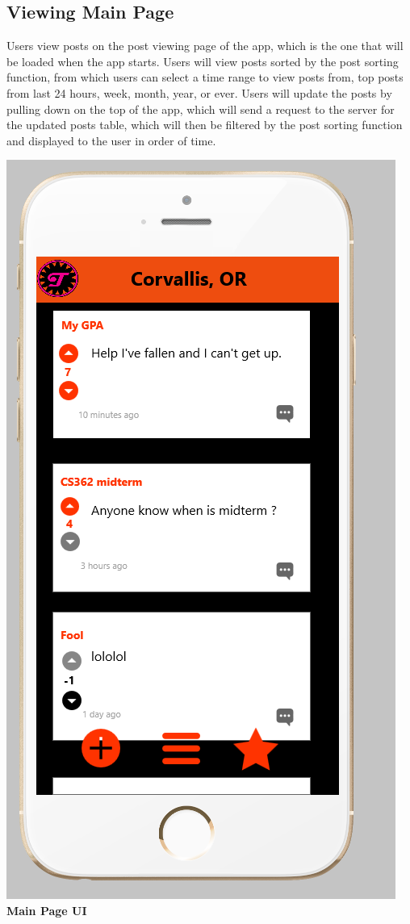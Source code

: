 \documentclass[12pt]{article}
\begin{document}
\subsection{Viewing Main Page}
Users view posts on the post viewing page of the app, which is the one that will be loaded when the app starts. Users will view posts sorted by the post sorting function, from which users can select a time range to view posts from, top posts from last 24 hours, week, month, year, or ever. Users will update the posts by pulling down on the top of the app, which will send a request to the server for the updated posts table, which will then be filtered by the post sorting function and displayed to the user in order of time.
\begin{center}
\includegraphics[scale=0.30]{img/ui/view}\linebreak
\textbf{Main Page UI}
  \end{center}
\end{document}
